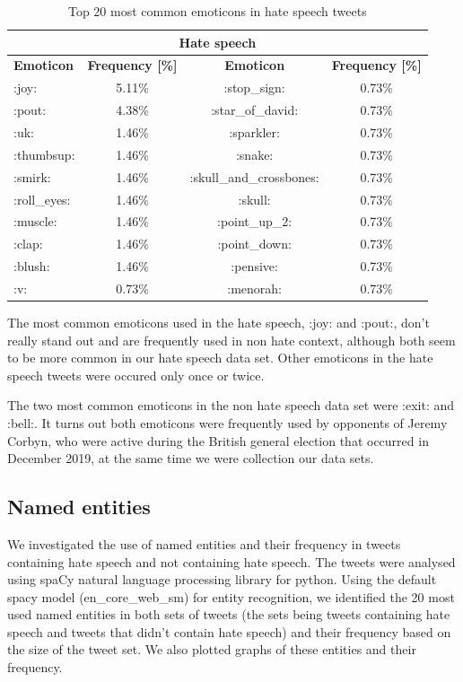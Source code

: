 \documentclass[conference]{IEEEtran}
\begin{document}
\begin{table}[!ht]
    \def\arraystretch{1.2}%
    \begin{center}
      \caption{Top 20 most common emoticons in hate speech tweets}
      \label{tab:emoticons_hate}
      \begin{tabular}{l c | c c}
        \hline\hline
        \multicolumn{4}{c}{\textbf{Hate speech}}\\
        \hline
        \textbf{Emoticon}&\textbf{Frequency [\%]}&\textbf{Emoticon}&\textbf{Frequency [\%]}\\
        \hline
        :joy: & 5.11\% & :stop\_sign: & 0.73\%\\
        :pout: & 4.38\% & :star\_of\_david: & 0.73\%\\
        :uk: & 1.46\% & :sparkler: & 0.73\%\\
        :thumbsup: & 1.46\% & :snake: & 0.73\%\\
        :smirk: & 1.46\% & :skull\_and\_crossbones: & 0.73\%\\
        :roll\_eyes: & 1.46\% & :skull: & 0.73\%\\
        :muscle: & 1.46\% & :point\_up\_2: & 0.73\%\\
        :clap: & 1.46\% & :point\_down: & 0.73\%\\
        :blush: & 1.46\% & :pensive: & 0.73\%\\
        :v: & 0.73\% & :menorah: & 0.73\%\\                        
        \hline\hline
      \end{tabular}  
    \end{center}
\end{table}

The most common emoticons used in the hate speech, :joy: and :pout:, don't really stand out 
and are frequently used in non hate context, although both seem to be more common in our 
hate speech data set. Other emoticons in the hate speech tweets were occured only once or twice.

The two most common emoticons in the non hate speech data set were :exit: and :bell:. 
It turns out both emoticons were frequently used by opponents of Jeremy Corbyn, who 
were active during the British general election that occurred in December 2019, at 
the same time we were collection our data sets.

\subsection{Named entities}
We investigated the use of named entities and their frequency in tweets containing hate speech and not containing hate speech.  The tweets were analysed using spaCy natural language processing library for python. Using the default spacy model (en_core_web_sm) for entity recognition, we identified the 20 most used named entities in both sets of tweets (the sets being tweets containing hate speech and tweets that didn’t contain hate speech) and their frequency based on the size of the tweet set. We also plotted graphs of these entities and their frequency.
\end{document}
